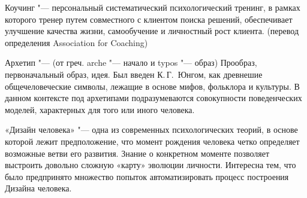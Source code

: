 \documentclass[10pt, a5paper]{article}
\begin{document}
Коучинг "--- персональный систематический психологический тренинг, в рамках которого тренер путем совместного с клиентом поиска решений, обеспечивает улучшение качества жизни, самообучение и личностный рост клиента. (перевод определения Association for Coaching)

Архетип "--- (от греч. arche "--- начало и typos "--- образ) Прообраз, первоначальный образ, идея. Был введен К.\,Г.~Юнгом, как древнешие общечеловеческие символы, лежащие в основе мифов, фольклора и культуры. В данном контексте под архетипами подразумеваются совокупности поведенческих моделей, характерных для того или иного человека.

«Дизайн человека» "--- одна из современных психологических теорий, в основе которой лежит предположение, что момент рождения человека четко определяет возможные ветви его развития. Знание о конкретном моменте позволяет выстроить довольно сложную «карту» эволюции личности. Интересна тем, что было предпринято множество попыток автоматизировать процесс построения Дизайна человека.
\end{document}
